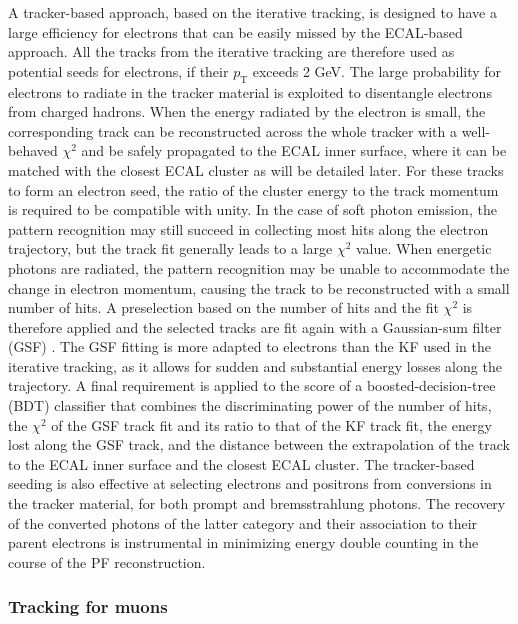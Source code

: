 A tracker-based approach, based on the iterative tracking, is designed to have a large efficiency for electrons that can be easily missed by the ECAL-based approach. All the tracks from the iterative tracking are therefore used as potential seeds for electrons, if their $p_{\mathrm{T}}$ exceeds 2 GeV. The large probability for electrons to radiate in the tracker material is exploited to disentangle electrons from charged hadrons. When the energy radiated by the electron is small, the corresponding track can be reconstructed across the whole tracker with a well-behaved $\chi^2$ and be safely propagated to the ECAL inner surface, where it can be matched with the closest ECAL cluster as will be detailed later.  For these tracks to form an electron seed, the ratio of the cluster energy to the track momentum is required to be compatible with unity. In the case of soft photon emission, the pattern recognition may still succeed in collecting most hits along the electron trajectory, but the track fit generally leads to a large $\chi^2$ value.  When energetic photons are radiated, the pattern recognition may be unable to accommodate the change in electron momentum, causing the track to be reconstructed with a small number of hits. A preselection based on the number of hits and the fit $\chi^2$ is therefore applied and the selected tracks are fit again with a Gaussian-sum filter (GSF) \cite{Adam_2005}. The GSF fitting is more adapted to electrons than the KF used in the iterative tracking, as it allows for sudden and substantial energy losses along the trajectory. A final requirement is applied to the score of a boosted-decision-tree (BDT) classifier that combines the discriminating power of the number of hits, the $\chi^2$ of the GSF track fit and its ratio to that of the KF track fit, the energy lost along the GSF track, and the distance between the extrapolation of the track to the ECAL inner surface and the closest ECAL cluster. The tracker-based seeding is also effective at selecting electrons and positrons from conversions in the tracker material, for both prompt and bremsstrahlung photons.  The recovery of the converted photons of the latter category and their association to their parent electrons is instrumental in minimizing energy double counting in the course of the PF reconstruction.


\subsubsection{Tracking for muons}

